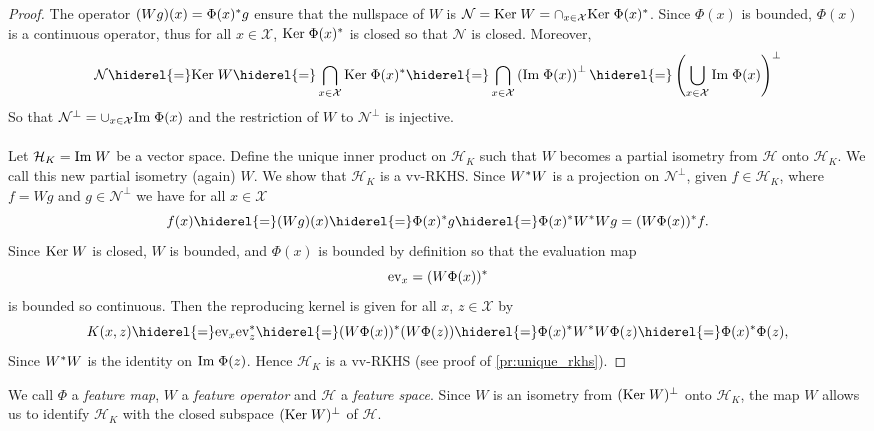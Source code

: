\begin{proof} The operator $(Wg)(x)=\Phi(x)^* g$ ensure that the nullspace of $W$ is $\mathcal{N}=\text{Ker}\; W=\cap_{x\in\mathcal{X}}\text{Ker}\; \Phi(x)^*$. Since $\Phi(x)$ is bounded, $\Phi(x)$ is a continuous operator, thus for all $x\in\mathcal{X}$, $\text{Ker}\; \Phi(x)^*$ is closed so that $\mathcal{N}$ is closed. Moreover,
\begin{dmath*}
\mathcal{N}\hiderel{=}\Ker W\hiderel{=}\bigcap_{x\in\mathcal{X}}\Ker \Phi(x)^\adjoint\hiderel{=}\bigcap_{x\in\mathcal{X}}\left(\Ima \Phi(x)\right)^{\perp}\hiderel{=}\left(\bigcup_{x\in\mathcal{X}}\Ima \Phi(x)\right)^{\perp}
\end{dmath*}
So that $\mathcal{N}^\perp=\cup_{x\in\mathcal{X}}\text{Im}\; \Phi(x)$ and the restriction of $W$ to $\mathcal{N}^{\perp}$ is injective.
\paragraph{}
Let $\mathcal{H}_K=\text{Im}\; W$ be a vector space. Define the unique inner product on $\mathcal{H}_K$ such that $W$ becomes a partial isometry from $\mathcal{H}$ onto $\mathcal{H}_K$. We call this new partial isometry (again) $W$. We show that $\mathcal{H}_K$ is a \acl{vv-RKHS}. Since $W^* W$ is a projection on $\mathcal{N}^{\perp}$, given $f\in\mathcal{H}_K$, where $f=Wg$ and $g\in\mathcal{N}^{\perp}$ we have for all $x\in\mathcal{X}$
\begin{dmath*}
f(x)\hiderel{=}(Wg)(x)\hiderel{=}\Phi(x)^\adjoint g\hiderel{=}\Phi(x)^\adjoint W^\adjoint Wg=(W\Phi(x))^\adjoint f.
\end{dmath*}
Since $\text{Ker}\; W$ is closed, $W$ is bounded, and $\Phi(x)$ is bounded by definition so that the evaluation map
\begin{dmath*}
\text{ev}_x=(W\Phi(x))^\adjoint
\end{dmath*}
is bounded so continuous. Then the reproducing kernel is given for all $x$, $z\in\mathcal{X}$ by
\begin{dmath*}
K(x,z)\hiderel{=}\text{ev}_x\text{ev}_z^\adjoint\hiderel{=}(W\Phi(x))^\adjoint(W\Phi(z))\hiderel{=}\Phi(x)^\adjoint W^\adjoint W\Phi(z)\hiderel{=}\Phi(x)^\adjoint\Phi(z),
\end{dmath*}
Since $W^* W$ is the identity on $\text{Im}\; \Phi(z)$. Hence $\mathcal{H}_K$ is a \acs{vv-RKHS} (see proof of \cref{pr:unique_rkhs}).
\end{proof}
We call $\Phi$ a \emph{feature map}, $W$ a \emph{feature operator} and $\mathcal{H}$ a \emph{feature space}. Since $W$ is an isometry from $(\text{Ker}\; W)^\perp$ onto $\mathcal{H}_K$, the map $W$ allows us to identify $\mathcal{H}_K$ with the closed subspace $(\text{Ker}\; W)^\perp$ of $\mathcal{H}$.
